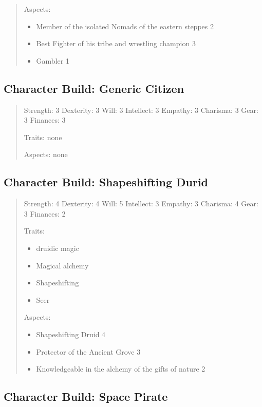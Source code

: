 \documentclass[11pt]{article}
\begin{document}
{\begin{quote}
Aspects:
\begin{itemize}
\item Member of the isolated Nomads of the eastern steppes 2
\item Best Fighter of his tribe and wrestling champion 3
\item Gambler 1
\end{itemize}
\end{quote}

\subsection{Character Build: Generic Citizen}
\label{sec:org6084e01}

\begin{quote}
Strength: 3
Dexterity: 3
Will: 3
Intellect: 3
Empathy: 3
Charisma: 3
Gear: 3
Finances: 3

Traits:
none

Aspects:
none
\end{quote}

\subsection{Character Build: Shapeshifting Durid}
\label{sec:org8e9a69a}

\begin{quote}
Strength: 4
Dexterity: 4
Will: 5
Intellect: 3
Empathy: 3
Charisma: 4
Gear: 3
Finances: 2

Traits:
\begin{itemize}
\item druidic magic
\item Magical alchemy
\item Shapeshifting
\item Seer
\end{itemize}

Aspects:
\begin{itemize}
\item Shapeshifting Druid 4
\item Protector of the Ancient Grove 3
\item Knowledgeable in the alchemy of the gifts of nature 2
\end{itemize}
\end{quote}

\subsection{Character Build: Space Pirate}
\label{sec:org8789291}

}
\end{document}
